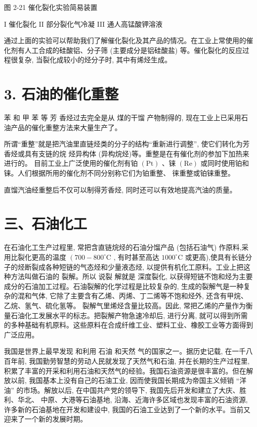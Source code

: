 \documentclass[10pt]{article}
\begin{document}
图 2-21 催化裂化实验简易装置

I 催化裂化 II 部分裂化气冷凝 III 通人高锰酸钾溶液

通过上面的实验可以帮助我们了解催化裂化及其产品的情况。在工业上常使用的催化剂有人工合成的硅酸铝、分子筛 (主要成分是铝硅酸盐) 等。催化裂化的反应过程很复杂, 当裂化成较小的烃分子时, 其中有烯烃生成。

\section*{3. 石油的催化重整}

苯 和 甲 苯 等 芳 香烃过去完全是从 煤的干馏 产物制得的, 现在工业上已采用石油产品的催化重整方法来大量生产了。

所谓“重整”就是把汽油里直链烃类的分子的结构“重新进行调整”, 使它们转化为芳香烃或具有支链的烷 烃异构体 (异构烷烃)等。重整是在有催化剂的参加下加热来进行的。 目前工业上广泛使用的催化剂有铂 \(\left( \mathrm{{Pt}}\right)\) 、铼 \(\left( \mathrm{{Re}}\right)\) 或同时使用铂和铼。人们根据所用的催化剂不同分别称它们为铂重整、 徕重整或铂铼重整。

直馏汽油经重整后不仅可以制得芳香烃, 同时还可以有效地提高汽油的质量。

\section*{三、石油化工}

在石油化工生产过程里, 常把含直链烷烃的石油分馏产品 (包括石油气) 作原料,采用比裂化更高的温度 \(\left( {{700} - {800}^{ \circ }\mathrm{C}}\right.\) , 有时甚至高达 \({1000}^{ \circ }\mathrm{C}\) 或更高),使具有长链分子的烃断裂成各种短链的气态烃和少量液态烃, 以提供有机化工原料。工业上把这种方法叫做石油的 裂解。所以 说裂 解就是 深度裂化, 以获得短链不饱和烃为主要成分的石油加工过程。石油裂解的化学过程是比较复杂的, 生成的裂解气是一种复杂的混和气体, 它除了主要含有乙烯、丙烯、丁二烯等不饱和烃外, 还含有甲烷、乙烷、氢气、硫化氢等。 裂解气里烯烃含量比较高。因此, 常把乙烯的产量作为衡量石油化工发展水平的标志。把裂解产物急速冷却后, 进行分离, 就可以得到所需的多种基础有机原料。这些原料在合成纤维工业、塑料工业、橡胶工业等方面得到广泛应用。

我国是世界上最早发现 和利用 石油 和天然 气的国家之一。据历史记载, 在一千八百年前, 我国勤劳智慧的劳动人民就发现了天然气和石油, 并在长期的生产过程里, 积累了丰富的开采和利用石油和天然气的经验。我国石油资源是很丰富的。但在解放以前, 我国基本上没有自己的石油工业, 因而使我国长期成为帝国主义倾销 “洋油” 的市场。解放以后, 在中国共产党的领导下, 我国先后开发和建立了大庆、胜利、华北、 中原、大港等石油基地, 沿海、近海许多区域也发现丰富的石油资源, 许多新的石油基地在开发和建设中, 我国的石油工业达到了一个新的水平。当前又迎来了一个新的发展时期。
\end{document}
